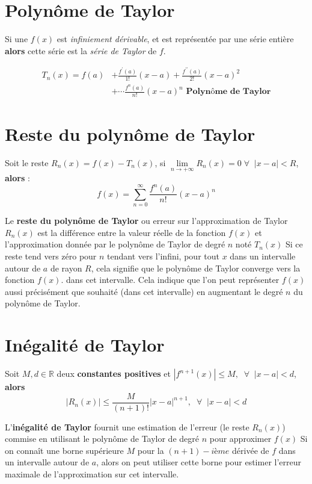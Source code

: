\documentclass{report}
\begin{document}
\begin{multicols*}{3}
  \section{Polynôme de Taylor}
  Si une $f(x)$ est \textit{infiniement dérivable}, 
  et est représentée par une série entière 
  \textbf{alors} cette série est la 
  \textit{série de Taylor} de $f$.   
  \vspace{-1em}

  \begin{align*}
    T_n(x) = f(a) &+ \frac{f^{\prime}(a)}{1!}(x - a) + 
             \frac{f^{\prime\prime}(a)}{2!}(x - a)^2  
             \\
       &+      \cdots
      \frac{f^{n}(a)}{n!}(x - a)^n 
      \textbf{ Polynôme de Taylor}             
  \end{align*}

  \section{Reste du polynôme de Taylor}
  Soit le reste $R_n(x) =  f(x) - T_n(x)$, si 
  $\lim\limits_{n \to+\infty }R_n(x) = 0 
  \;\forall \;\; |x - a| < R $, \textbf{alors}  :
  \[ 
        f(x) = \sum_{n=0}^{\infty } 
        \frac{f^{n}(a)}{n!}(x - a)^n   
    \]

    Le \textbf{reste du polynôme de Taylor} ou 
    erreur sur l'approximation de Taylor 
    $R_n(x)$ est la différence entre la valeur 
    réelle de la fonction $f(x)$ 
    et l'approximation donnée par le polynôme de 
    Taylor de degré $n$ noté $T_n(x)$
    Si ce reste tend vers zéro pour $n$ tendant 
    vers l'infini, pour tout $x$ dans un 
    intervalle autour de $a$ de rayon $R$, 
    cela signifie que le polynôme de Taylor 
    converge vers la fonction $f(x)$. dans cet 
    intervalle. Cela indique que l'on peut 
    représenter $f(x)$ aussi précisément que 
    souhaité (dans cet intervalle) en augmentant 
    le degré $n$ du polynôme de Taylor.


  \section{Inégalité de Taylor}
  Soit $M, d \in \mathbb{R}$ deux 
  \textbf{constantes positives}  
  et $|f^{n+1}(x)| \leq M, \;\; \forall \;\; |x - a| < d$, 
  \textbf{alors}
  \[ 
    |R_n(x)| \leq \frac{M}{(n+1)!}|x - a|^{n+1}, \;\; 
        \forall \;\; |x - a | < d 
  \]

  L'\textbf{inégalité de Taylor} fournit une 
  estimation de l'erreur (le reste $R_n(x)$)
  commise en utilisant le polynôme de Taylor de 
  degré $n$ pour approximer $f(x)$  
  Si on connaît une borne supérieure 
  $M$ pour la $(n+1)-ième $ dérivée de 
  $f$ dans un intervalle autour de 
  $a$, alors on peut utiliser cette borne pour 
  estimer l'erreur maximale de l'approximation 
  sur cet intervalle.


\end{multicols*}
\end{document}
